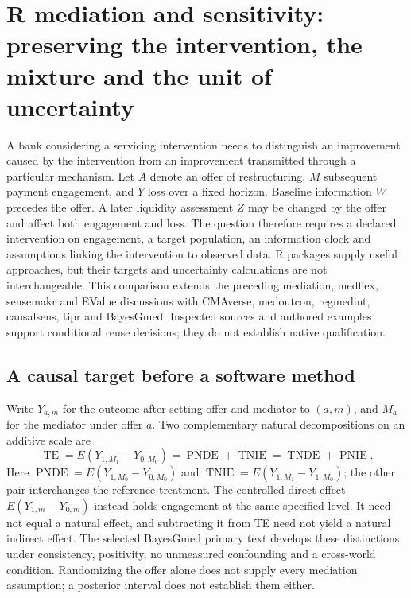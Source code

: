 \section[R mediation and sensitivity contracts]{R mediation and sensitivity: preserving the intervention, the mixture and the unit of uncertainty}
\label{sec:exec25-rmed}

A bank considering a servicing intervention needs to distinguish an improvement
caused by the intervention from an improvement transmitted through a particular
mechanism. Let $A$ denote an offer of restructuring, $M$ subsequent payment
engagement, and $Y$ loss over a fixed horizon. Baseline information $W$ precedes
the offer. A later liquidity assessment $Z$ may be changed by the offer and
affect both engagement and loss. The question therefore requires a declared
intervention on engagement, a target population, an information clock and
assumptions linking the intervention to observed data. R packages supply useful
approaches, but their targets and uncertainty calculations are not interchangeable.
This comparison extends the preceding mediation, medflex, sensemakr and EValue
discussions with CMAverse, medoutcon, regmedint, causalsens, tipr and BayesGmed.
Inspected sources and authored examples support conditional reuse decisions;
they do not establish native qualification. \citep{exec25_rmed_choice}

\subsection{A causal target before a software method}

Write $Y_{a,m}$ for the outcome after setting offer and mediator to $(a,m)$,
and $M_a$ for the mediator under offer $a$. Two complementary natural
decompositions on an additive scale are
\[
 \operatorname{TE}=E(Y_{1,M_1}-Y_{0,M_0})
 =\operatorname{PNDE}+\operatorname{TNIE}
 =\operatorname{TNDE}+\operatorname{PNIE}.
\]
Here $\operatorname{PNDE}=E(Y_{1,M_0}-Y_{0,M_0})$ and
$\operatorname{TNIE}=E(Y_{1,M_1}-Y_{1,M_0})$; the other pair interchanges the
reference treatment. The controlled direct effect $E(Y_{1,m}-Y_{0,m})$ instead
holds engagement at the same specified level. It need not equal a natural
effect, and subtracting it from TE need not yield a natural indirect effect.
The selected BayesGmed primary text develops these distinctions under consistency,
positivity, no unmeasured confounding and a cross-world condition. Randomizing
the offer alone does not supply every mediation assumption; a posterior interval
does not establish them either. \citep{exec25_rmed_yimer_paper}

